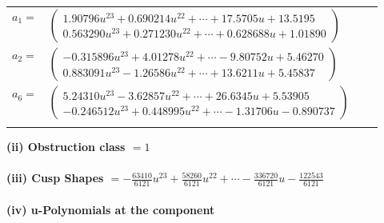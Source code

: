 \documentclass[1p]{elsarticle_modified}
\theoremstyle{definition}
\begin{document}
\begin{tabular}{m{7pt} m{180pt} m{7pt} m{180pt} }
\flushright $a_{1}=$&$\begin{pmatrix}1.90796 u^{23}+0.690214 u^{22}+\cdots+17.5705 u+13.5195\\0.563290 u^{23}+0.271230 u^{22}+\cdots+0.628688 u+1.01890\end{pmatrix}$ \\
\flushright $a_{2}=$&$\begin{pmatrix}-0.315896 u^{23}+4.01278 u^{22}+\cdots-9.80752 u+5.46270\\0.883091 u^{23}-1.26586 u^{22}+\cdots+13.6211 u+5.45837\end{pmatrix}$ \\
\flushright $a_{6}=$&$\begin{pmatrix}5.24310 u^{23}-3.62857 u^{22}+\cdots+26.6345 u+5.53905\\-0.246512 u^{23}+0.448995 u^{22}+\cdots-1.31706 u-0.890737\end{pmatrix}$\\&\end{tabular}
\flushleft \textbf{(ii) Obstruction class $= 1$}\\~\\
\flushleft \textbf{(iii) Cusp Shapes $= -\frac{63410}{6121} u^{23}+\frac{58260}{6121} u^{22}+\cdots-\frac{336720}{6121} u-\frac{122543}{6121}$}\\~\\
\newpage\renewcommand{\arraystretch}{1}
\flushleft \textbf{(iv) u-Polynomials at the component}\newline \\
\end{document}

